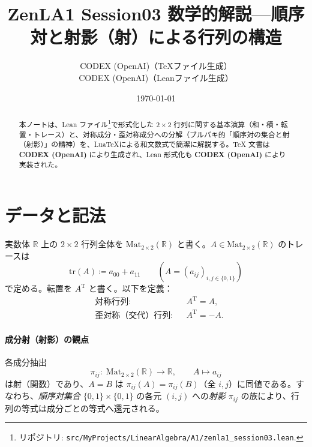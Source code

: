 \documentclass[luatexja,ja=standard,a4paper,12pt]{bxjsarticle}
\title{ZenLA1 Session03 数学的解説\;—\;順序対と射影（射）による行列の構造}
\author{CODEX (OpenAI)（TeXファイル生成）\\ CODEX (OpenAI)（Leanファイル生成）}
\date{\today}
\newcommand{\R}{\mathbb{R}}
\newcommand{\Mat}{\mathrm{Mat}}
\newcommand{\MatTwo}{\Mat_{2\times 2}(\R)}
\newcommand{\tr}{\mathrm{tr}}
\newcommand{\TT}{\mathrm{T}}
\theoremstyle{definition}
\theoremstyle{plain}
\theoremstyle{remark}
\begin{document}
\maketitle

\begin{abstract}
本ノートは、Lean ファイル\footnote{リポジトリ: \texttt{src/MyProjects/LinearAlgebra/A1/zenla1\_session03.lean}.}で形式化した 2\,$\times$\,2 行列に関する基本演算（和・積・転置・トレース）と、対称成分・歪対称成分への分解（ブルバキ的「順序対の集合と射（射影）」の精神）を、Lua\TeX による和文数式で簡潔に解説する。TeX 文書は \textbf{CODEX (OpenAI)} により生成され、Lean 形式化も \textbf{CODEX (OpenAI)} により実装された。
\end{abstract}

\section{データと記法}
実数体 $\R$ 上の $2\times 2$ 行列全体を $\MatTwo$ と書く。$A\in\MatTwo$ のトレースは
\[
  \tr(A) \coloneqq a_{00}+a_{11}\qquad (A=(a_{ij})_{i,j\in\{0,1\}})
\]
で定める。転置を $A^{\TT}$ と書く。以下を定義：
\begin{align*}
  &\text{対称行列}:&& A^{\TT}=A,\\
  &\text{歪対称（交代）行列}:&& A^{\TT}=-A.
\end{align*}

\paragraph{成分射（射影）の観点}
各成分抽出
\[
  \pi_{ij}:\; \MatTwo\longrightarrow \R,\qquad A\longmapsto a_{ij}
\]
は射（関数）であり、$A=B$ は $\pi_{ij}(A)=\pi_{ij}(B)$（全 $i,j$）に同値である。すなわち、\emph{順序対集合} $\{0,1\}\times\{0,1\}$ の各元 $(i,j)$ への\emph{射影} $\pi_{ij}$ の族により、行列の等式は成分ごとの等式へ還元される。

\begin{center}
\end{center}
\end{document}
